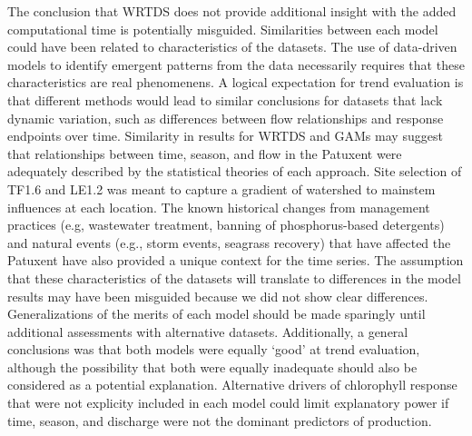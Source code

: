 \documentclass[letterpaper,12pt,oneside]{article}\usepackage[]{graphicx}\usepackage[]{color}
\begin{document}
The conclusion that \ac{WRTDS} does not provide additional insight with the added computational time is potentially misguided.  Similarities between each model could have been related to characteristics of the datasets.  The use of data-driven models to identify emergent patterns from the data necessarily requires that these characteristics are real phenomenens.  A logical expectation for trend evaluation is that different methods would lead to similar conclusions for datasets that lack dynamic variation, such as differences between flow relationships and response endpoints over time.  Similarity in results for \ac{WRTDS} and \acp{GAM} may suggest that relationships between time, season, and flow in the Patuxent were adequately described by the statistical theories of each approach.  Site selection of TF1.6 and LE1.2 was meant to capture a gradient of watershed to mainstem influences at each location.  The known historical changes from management practices (e.g, wastewater treatment, banning of phosphorus-based detergents) and natural events (e.g., storm events, seagrass recovery) that have affected the Patuxent have also provided a unique context for the time series.  The assumption that these characteristics of the datasets will translate to differences in the model results may have been misguided because we did not show clear differences.  Generalizations of the merits of each model should be made sparingly until additional assessments with alternative datasets.  Additionally, a general conclusions was that both models were equally `good' at trend evaluation, although the possibility that both were equally inadequate should also be considered as a potential explanation.  Alternative drivers of chlorophyll response that were not explicity included in each model could limit explanatory power if time, season, and discharge were not the dominant predictors of production.  
\end{document}
